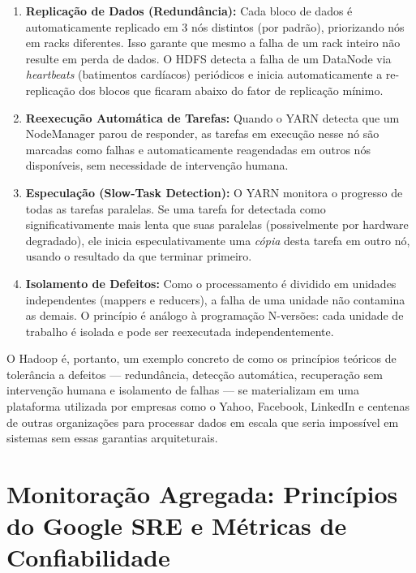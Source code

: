 \documentclass[12pt,a4paper]{report}
\begin{document}
\begin{enumerate}
    \item \textbf{Replicação de Dados (Redundância):} Cada bloco de dados é
    automaticamente replicado em 3 nós distintos (por padrão), priorizando nós
    em racks diferentes. Isso garante que mesmo a falha de um rack inteiro não
    resulte em perda de dados. O HDFS detecta a falha de um DataNode via
    \emph{heartbeats} (batimentos cardíacos) periódicos e inicia automaticamente
    a re-replicação dos blocos que ficaram abaixo do fator de replicação mínimo.

    \item \textbf{Reexecução Automática de Tarefas:} Quando o YARN detecta que
    um NodeManager parou de responder, as tarefas em execução nesse nó são
    marcadas como falhas e automaticamente reagendadas em outros nós disponíveis,
    sem necessidade de intervenção humana.

    \item \textbf{Especulação (Slow-Task Detection):} O YARN monitora o
    progresso de todas as tarefas paralelas. Se uma tarefa for detectada como
    significativamente mais lenta que suas paralelas (possivelmente por hardware
    degradado), ele inicia especulativamente uma \emph{cópia} desta tarefa em
    outro nó, usando o resultado da que terminar primeiro.

    \item \textbf{Isolamento de Defeitos:} Como o processamento é dividido em
    unidades independentes (mappers e reducers), a falha de uma unidade não
    contamina as demais. O princípio é análogo à programação N-versões: cada
    unidade de trabalho é isolada e pode ser reexecutada independentemente.
\end{enumerate}

O Hadoop é, portanto, um exemplo concreto de como os princípios teóricos de
tolerância a defeitos --- redundância, detecção automática, recuperação sem
intervenção humana e isolamento de falhas --- se materializam em uma plataforma
utilizada por empresas como o Yahoo, Facebook, LinkedIn e centenas de outras
organizações para processar dados em escala que seria impossível em sistemas
sem essas garantias arquiteturais.

\clearpage


\chapter{Monitoração Agregada: Princípios do Google SRE e Métricas de Confiabilidade}
\end{document}
